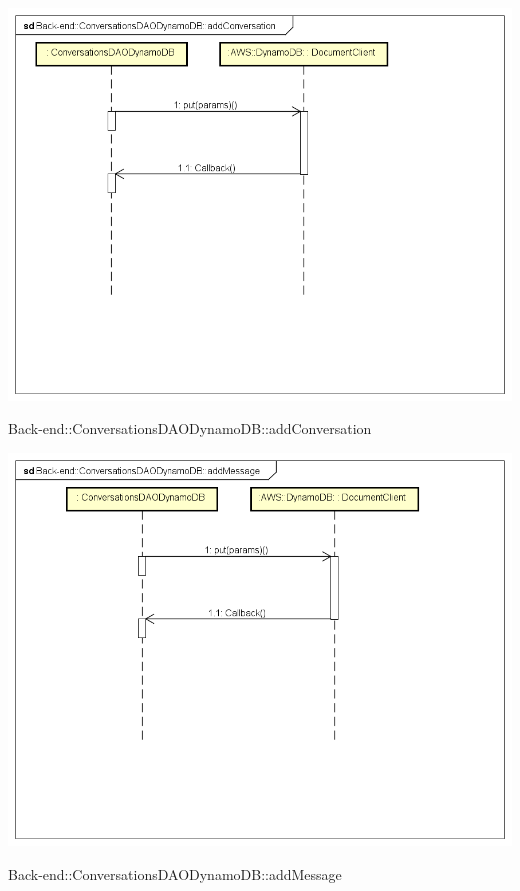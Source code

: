 \includegraphics[width=\textwidth,height=\textheight,keepaspectratio]{images/diagrams/back-end/Ufficial_Backend/Back-end__ConversationsDAODynamoDB__addConversation.png} 	\caption{Back-end::ConversationsDAODynamoDB::addConversation}
\includegraphics[width=\textwidth,height=\textheight,keepaspectratio]{images/diagrams/back-end/Ufficial_Backend/Back-end__ConversationsDAODynamoDB__addMessage.png} 	\caption{Back-end::ConversationsDAODynamoDB::addMessage}
